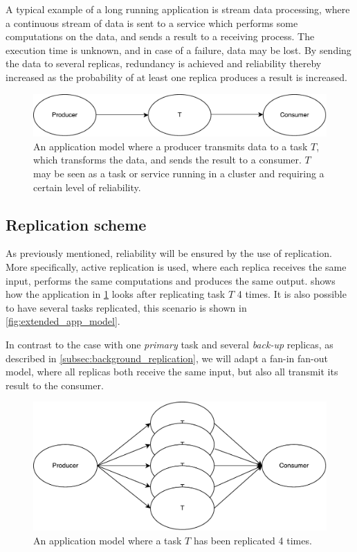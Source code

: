 \documentclass{cslthse-msc}
\begin{document}
A typical example of a long running application is stream data processing, where a continuous stream of data is sent to a service which performs some computations on the data, and sends a result to a receiving process. The execution time is unknown, and in case of a failure, data may be lost. By sending the data to several replicas, redundancy is achieved and reliability thereby increased as the probability of at least one replica produces a result is increased.

\begin{figure}[!hbt]
\centering
\includegraphics[scale=0.5]{images/app_model.pdf} 
\caption[Application model]{An application model where a producer transmits data to a task $T$, which transforms the data, and sends the result to a consumer. $T$ may be seen as a task or service running in a cluster and requiring a certain level of reliability.}\label{fig:app_model}
\end{figure}

\subsection{Replication scheme} \label{subsec:design_repl_scheme}
As previously mentioned, reliability will be ensured by the use of replication. More specifically, active replication is used, where each replica receives the same input, performs the same computations and produces the same output.  shows how the application in \cref{fig:app_model} looks after replicating task $T$ 4 times. It is also possible to have several tasks replicated, this scenario is shown in \cref{fig:extended_app_model}.

In contrast to the case with one \emph{primary} task and several \emph{back-up} replicas, as described in \cref{subsec:background_replication}, we will adapt a fan-in fan-out model, where all replicas both receive the same input, but also all transmit its result to the consumer. %

\begin{figure}[!hbt]
\centering
\includegraphics[scale=0.5]{images/app_model_replication.pdf} 
\caption[Application model with replicas]{An application model where a task $T$ has been replicated 4 times.}\label{fig:app_model_replication}
\end{figure}
\end{document}
